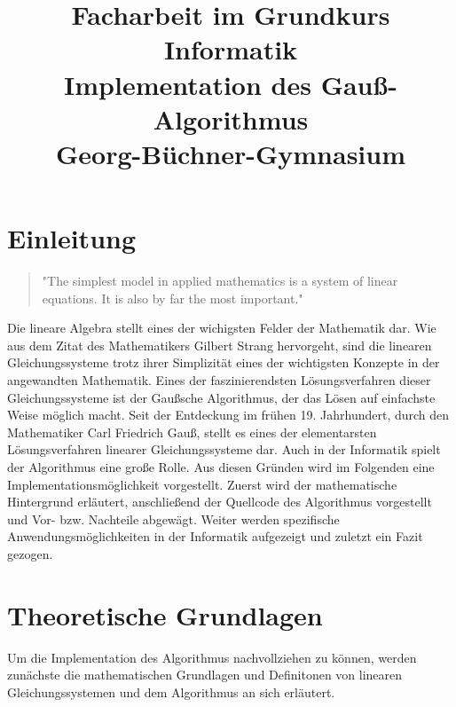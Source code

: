 \documentclass[a4paper, 12pt]{report}
\title{\LARGE Facharbeit im Grundkurs Informatik  \vspace*{0.5cm} \\
  \Huge Implementation des Gauß-Algorithmus \vspace*{0.5cm} \\
  \LARGE Georg-Büchner-Gymnasium}
\begin{document}
\maketitle
\tableofcontents

{\let\clearpage\relax \chapter{Einleitung}}
\begin{quote}
    "The simplest model in applied mathematics is a system of linear equations. It is also by far the most important."
\end{quote}

Die lineare Algebra stellt eines der wichigsten Felder der Mathematik dar. Wie aus dem Zitat des Mathematikers Gilbert Strang hervorgeht, sind die linearen Gleichungssysteme trotz ihrer Simplizität eines der wichtigsten Konzepte
in der angewandten Mathematik.
Eines der faszinierendsten Lösungsverfahren dieser Gleichungssysteme ist der Gaußsche Algorithmus,
der das Lösen auf einfachste Weise möglich macht. Seit der Entdeckung im frühen 19. Jahrhundert, durch den
Mathematiker Carl Friedrich Gauß, stellt es eines der elementarsten Lösungsverfahren linearer Gleichungssysteme dar.
Auch in der Informatik spielt der Algorithmus eine große Rolle. Aus diesen Gründen wird im Folgenden eine Implementationsmöglichkeit
vorgestellt. Zuerst wird der mathematische Hintergrund erläutert, anschließend der Quellcode des Algorithmus vorgestellt und  Vor- bzw. Nachteile abgewägt.
Weiter werden spezifische Anwendungsmöglichkeiten in der Informatik aufgezeigt und zuletzt ein Fazit gezogen.

{\let\clearpage\relax \chapter{Theoretische Grundlagen}}
Um die Implementation des Algorithmus nachvollziehen zu können, werden zunächste die mathematischen Grundlagen und Definitonen
von linearen Gleichungssystemen und dem Algorithmus an sich erläutert.
\end{document}

